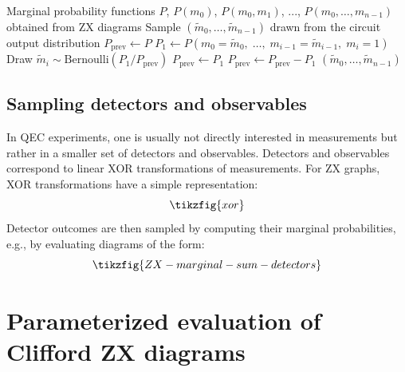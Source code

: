 \documentclass[
  a4paper,
  onecolumn,
  11pt,
  allowtoday
]{quantumarticle}
\begin{document}
\begin{algorithm}[H]
  \caption{Autoregressive sampling from marginal probabilities}\label{alg:autoregressive}
  \begin{algorithmic}[1]
    \Require Marginal probability functions $P$, $P(m_0)$, $P(m_0, m_1)$, ..., $P(m_0, \dots, m_{n-1})$ obtained from ZX diagrams
    \Ensure Sample $(\tilde m_0, \dots, \tilde m_{n-1})$ drawn from the circuit output distribution
    \State $P_{\mathrm{prev}} \gets P$ 
    \State $P_1 \gets P(m_0{=}\tilde m_0,\;\dots,\;m_{i-1}{=}\tilde m_{i-1},\;m_i{=}1)$
    \State Draw $\tilde m_i \sim \mathrm{Bernoulli}(P_1 / P_{\mathrm{prev}})$
    \State $P_{\mathrm{prev}} \gets P_1$
    \Else
    \State $P_{\mathrm{prev}} \gets P_{\mathrm{prev}} - P_1$
    \EndIf
    \EndFor
    \State \Return $(\tilde m_0, \dots, \tilde m_{n-1})$
  \end{algorithmic}
\end{algorithm}

\subsection{Sampling detectors and observables}
\label{sec:detectors_observables}

In QEC experiments, one is usually not directly interested in measurements but rather in a smaller set of detectors and observables. Detectors and observables correspond to linear XOR transformations of measurements. For ZX graphs, XOR transformations have a simple representation:
\begin{equation}
  \tikzfig{xor}
  \label{eqn:xor}
\end{equation}
Detector outcomes are then sampled by computing their marginal probabilities, e.g., by evaluating diagrams of the form:
\begin{equation}
  \tikzfig{ZX-marginal-sum-detectors}
  \label{eqn:zx_marginal_detectors}
\end{equation}

\section{Parameterized evaluation of Clifford ZX diagrams}
\label{sec:paramzx}
\end{document}
